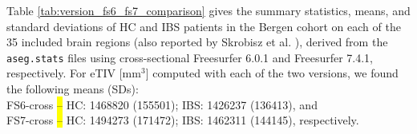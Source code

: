 \documentclass[diagnostics,article,accept,pdftex,moreauthors]{Definitions/mdpi}
\begin{document}
 Table \ref{tab:version_fs6_fs7_comparison} gives the summary statistics, means, and standard deviations of HC and IBS patients in the Bergen cohort on each of the 35 included brain regions (also reported by Skrobisz et al. \cite{Skrobisz2022}), derived from the \texttt{aseg.stats} files using cross-sectional Freesurfer  6.0.1 and Freesurfer 7.4.1, respectively. For eTIV [mm$^3$] computed with each of the two versions, we found the following means (SDs): \\
\indent FS6-cross \hl{--} %
 HC: 1468820 (155501); IBS: 1426237 (136413), and\\
\indent FS7-cross \hl{--} HC: 1494273 (171472); IBS: 1462311 (144145), respectively.


\begin{table}[H]
\setlength{\tabcolsep}{4.9pt}
\scriptsize


\end{table}
\end{document}
